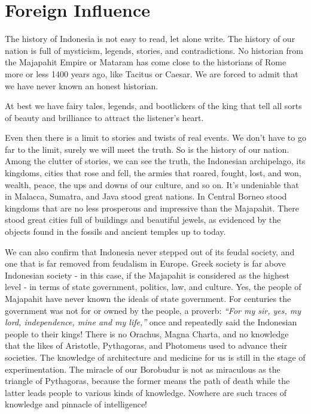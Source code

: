 \section{Foreign Influence}

The history of Indonesia is not easy to read, let alone write. The history of 
our nation is full of mysticism, legends, stories, and contradictions. No historian 
from the Majapahit Empire or Mataram has come close to the historians of Rome more 
or less 1400 years ago, like Tacitus or Caesar. We are forced to admit that we have never known an honest historian.\vskip 0.2in

At best we have fairy tales, legends, and bootlickers of the king that tell all sorts of 
beauty and brilliance to attract the listener's heart.\vskip 0.2in

Even then there is a limit to stories and twists of real events. We don't have to go far to 
the limit, surely we will meet the truth. So is the history of our nation. Among the clutter 
of stories, we can see the truth, the Indonesian archipelago, its kingdoms, cities that 
rose and fell, the armies that roared, fought, lost, and won, wealth, peace, the ups and 
downs of our culture, and so on. It's undeniable that in Malacca, Sumatra, and Java stood 
great nations. In Central Borneo stood kingdoms that are no less prosperous and impressive 
than the Majapahit. There stood great cities full of buildings and beautiful jewels, as 
evidenced by the objects found in the fossils and ancient temples up to today.\vskip 0.2in

We can also confirm that Indonesia never stepped out of its feudal society, and one that is 
far removed from feudalism in Europe. Greek society is far above Indonesian society - in this case, 
if the Majapahit is considered as the highest level - in terms of state government, politics, 
law, and culture. Yes, the people of Majapahit have never known the ideals of state government. 
For centuries the government was not for or owned by the people, a proverb: \emph{“For my sir, yes, my lord, independence, mine and my life,”} 
once and repeatedly said the Indonesian people to their kings! There is no Orachus, Magna Charta, 
and no knowledge that the likes of Aristotle, Pythagoras, and Photomeus used to advance their societies. 
The knowledge of architecture and medicine for us is still in the stage of experimentation. 
The miracle of our Borobudur is not as miraculous as the triangle of Pythagoras, because the former 
means the path of death while the latter leads people to various kinds of knowledge. Nowhere are such 
traces of knowledge and pinnacle of intelligence!\vskip 0.2in


